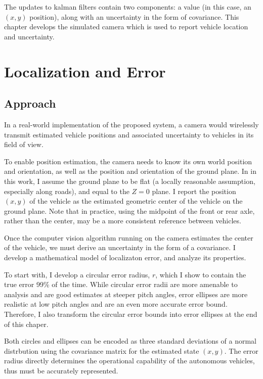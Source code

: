 \documentclass[a4paper,12pt,twoside,openright]{report}
\begin{document}
The updates to kalman filters contain two components: a value (in this case, an $(x,y)$ position),
along with an uncertainty in the form of covariance. This chapter
develops the simulated camera which is used to report vehicle 
location and uncertainty.
 
\section{Localization and Error}

\subsection{Approach}

In a real-world implementation of the proposed system, a camera would wirelessly
transmit estimated vehicle positions and associated uncertainty to vehicles in its field of view.

To enable position estimation, the camera needs to know its own world position and orientation, 
as well as the position and orientation of the ground plane. In in this work,
I assume the ground plane to be flat (a locally reasonable assumption, especially along roads), 
and equal to the $Z = 0$ plane. I report the position $(x,y)$ of the vehicle
as the estimated geometric center of the vehicle on the ground plane. 
Note that in practice, using the midpoint of the front or rear axle, rather than the center, 
may be a more consistent reference between vehicles.

Once the computer vision algorithm running on the camera estimates the center of the vehicle,
we must derive an uncertainty in the form of a covariance. I develop a mathematical model of localizaton error,
and analyze its properties. 

To start with, I develop a circular error radius, $r$, which I show to contain
the true error 99\% of the time. While circular error radii are more amenable to analysis and are good
estimates at steeper pitch angles, error ellipses are more realistic at low pitch angles and are an 
even more accurate error bound. Therefore, I also transform the circular error bounds into error ellipses at the end of this chaper.

Both circles and ellipses can be encoded as three standard deviations of a normal distrbution
using the covariance matrix for the estimated state $(x,y)$. The error radius directly determines
the operational capability of the autonomous vehicles, thus must be accurately represented.
\end{document}
